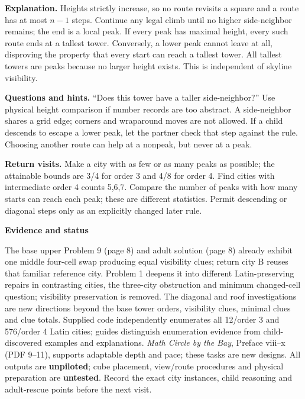 \documentclass[11pt]{article}
\newcommand\lead[1]{\textbf{#1}\par}
\begin{document}
\textbf{Explanation.} Heights strictly increase, so no route revisits a square and a route has at most $n-1$ steps. Continue any legal climb until no higher side-neighbor remains; the end is a local peak. If every peak has maximal height, every such route ends at a tallest tower. Conversely, a lower peak cannot leave at all, disproving the property that every start can reach a tallest tower. All tallest towers are peaks because no larger height exists. This is independent of skyline visibility.

\textbf{Questions and hints.} ``Does this tower have a taller side-neighbor?'' Use physical height comparison if number records are too abstract. A side-neighbor shares a grid edge; corners and wraparound moves are not allowed. If a child descends to escape a lower peak, let the partner check that step against the rule. Choosing another route can help at a nonpeak, but never at a peak.

\textbf{Return visits.} Make a city with as few or as many peaks as possible; the attainable bounds are 3/4 for order 3 and 4/8 for order 4. Find cities with intermediate order 4 counts 5,6,7. Compare the number of peaks with how many starts can reach each peak; these are different statistics. Permit descending or diagonal steps only as an explicitly changed later rule.

\lead{Evidence and status}
The base upper Problem 9 (page 8) and adult solution (page 8) already exhibit one middle four-cell swap producing equal visibility clues; return city B reuses that familiar reference city. Problem 1 deepens it into different Latin-preserving repairs in contrasting cities, the three-city obstruction and minimum changed-cell question; visibility preservation is removed. The diagonal and roof investigations are new directions beyond the base tower orders, visibility clues, minimal clues and clue totals. Supplied code independently enumerates all 12/order 3 and 576/order 4 Latin cities; guides distinguish enumeration evidence from child-discovered examples and explanations. \emph{Math Circle by the Bay}, Preface viii--x (PDF 9--11), supports adaptable depth and pace; these tasks are new designs. All outputs are \textbf{unpiloted}; cube placement, view/route procedures and physical preparation are \textbf{untested}. Record the exact city instances, child reasoning and adult-rescue points before the next visit.
\end{document}
